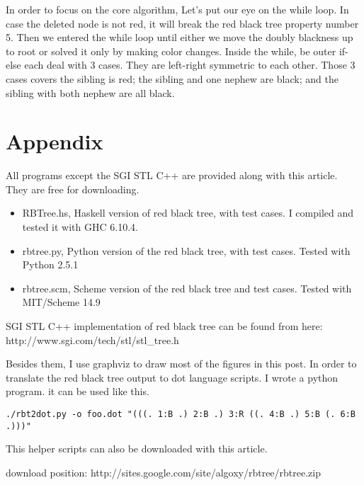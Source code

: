 \documentclass{article}
\begin{document}
In order to focus on the core algorithm, Let's put our eye on the
while loop. In case the deleted node is not red, it will break the red
black tree property number 5. Then we entered the while loop until
either we move the doubly blackness up to root or solved it only by
making color changes. Inside the while, be outer if-else each deal
with 3 cases. They are left-right symmetric to each other. Those 3
cases covers the sibling is red; the sibling and one nephew are black;
and the sibling with both nephew are all black.

\section{Appendix} \label{appendix}
All programs except the SGI STL C++ are provided along with this article. They are free for downloading.
\begin{itemize}
\item RBTree.hs, Haskell version of red black tree, with test cases. I compiled
and tested it with GHC 6.10.4.
\item rbtree.py, Python version of the red black tree, with test cases. Tested
with Python 2.5.1
\item rbtree.scm, Scheme version of the red black tree and test cases. Tested
with MIT/Scheme 14.9
\end{itemize}

SGI STL C++ implementation of red black tree can be found from here:
http://www.sgi.com/tech/stl/stl\_tree.h

Besides them, I use graphviz to draw most of the figures in this post. In order to
translate the red black tree output to dot language scripts. I wrote a python program.
it can be used like this.

\begin{verbatim}
./rbt2dot.py -o foo.dot "(((. 1:B .) 2:B .) 3:R ((. 4:B .) 5:B (. 6:B  .)))"
\end{verbatim}

This helper scripts can also be downloaded with this article.

download position: http://sites.google.com/site/algoxy/rbtree/rbtree.zip
\end{document}
